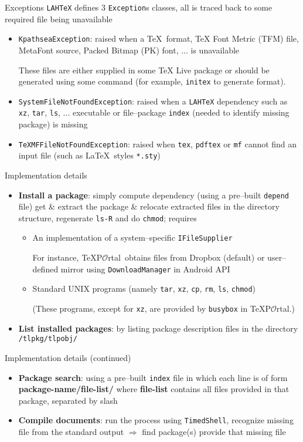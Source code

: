 \documentclass{beamer}
\newcommand{\TeXPortal}{\TeX P$\mathcal{O}$rtal}
\begin{document}
\begin{frame}[fragile]{Exceptions}
\verb/LAHTeX/ defines 3 \verb/Exception/s classes, all is traced back to some required file being unavailable
\begin{itemize}
\item \verb/KpathseaException/: raised when a \TeX\ format, TeX Font Metric (TFM) file, MetaFont source, Packed Bitmap (PK) font, ... is unavailable

These files are either supplied in some TeX Live package or should be generated using some command (for example, \verb/initex/ to generate format).
\item \verb/SystemFileNotFoundException/: raised when a \verb/LAHTeX/ dependency such as \verb/xz/, \verb/tar/, \verb/ls/, ... executable or file--package \verb/index/ (needed to identify missing package) is missing
\item \verb/TeXMFFileNotFoundException/: raised when \verb/tex/, \verb/pdftex/ or \verb/mf/ cannot find an input file (such as \LaTeX\ styles \verb/*.sty/)
\end{itemize}
\end{frame}

\begin{frame}[fragile]{Implementation details}
\begin{itemize}
\item \textbf{Install a package}: simply compute dependency (using a pre--built \verb/depend/ file) get \& extract the package \& relocate extracted files in the directory structure, regenerate \verb/ls-R/ and do \verb/chmod/; requires
\begin{itemize}
\item An implementation of a system--specific \verb/IFileSupplier/

For instance, \TeXPortal\ obtains files from Dropbox (default) or user--defined mirror using \verb/DownloadManager/ in Android API
\item Standard UNIX programs (namely \verb/tar/, \verb/xz/, \verb/cp/, \verb/rm/, \verb/ls/, \verb/chmod/)

(These programs, except for \verb/xz/, are provided by \verb/busybox/ in \TeXPortal.)
\end{itemize}
\item \textbf{List installed packages}: by listing package description files in the directory \verb_/tlpkg/tlpobj/_
\end{itemize}
\end{frame}

\begin{frame}[fragile]{Implementation details (continued)}
\begin{itemize}
\item \textbf{Package search}: using a pre--built \verb/index/ file in which each line is of form \textbf{package-name/file-list/} where \textbf{file-list} contains all files provided in that package, separated by slash
\item \textbf{Compile documents}: run the process using \verb/TimedShell/, recognize missing file from the standard output $\Rightarrow$ find package(s) provide that missing file
\end{itemize}
\end{frame}
\end{document}
